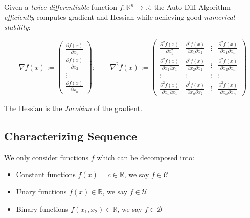 \documentclass[11pt,a4paper]{article}
\def\R{{\mathbb R}}
\theoremstyle{definition} %
\begin{document}
Given a \textit{twice differentiable} function $f: \R^n \to \R$, the
Auto-Diff Algorithm \textit{efficiently} computes gradient and Hessian
while achieving good \textit{numerical stability}:

\[
	\nabla f(x) := \begin{pmatrix}
		\frac{\partial f(x)}{\partial x_1} \\
		\frac{\partial f(x)}{\partial x_2} \\
		\vdots                             \\
		\frac{\partial f(x)}{\partial x_n}
	\end{pmatrix} ;
	\qquad
	\nabla ^2 f(x) :=
	\begin{pmatrix}
		\frac{\partial^2 f(x)}{\partial x_1^2}            &
		\frac{\partial^2 f(x)}{\partial x_1 \partial x_2} &
		\vdots                                            &
		\frac{\partial^2 f(x)}{\partial x_1 \partial x_n}   \\
		\frac{\partial^2 f(x)}{\partial x_2 \partial x_1} &
		\frac{\partial^2 f(x)}{\partial x_2 \partial x_2} &
		\vdots                                            &
		\frac{\partial^2 f(x)}{\partial x_2 \partial x_n}   \\
		\vdots                                            &
		\vdots                                            &
		\vdots                                            &
		\vdots                                              \\
		\frac{\partial^2 f(x)}{\partial x_n \partial x_1} &
		\frac{\partial^2 f(x)}{\partial x_n \partial x_2} &
		\vdots                                            &
		\frac{\partial^2 f(x)}{\partial x_n \partial x_n}
	\end{pmatrix}
\]

The Hessian is the \textit{Jacobian} of the gradient.

\subsection{Characterizing Sequence}

We only consider functions $f$ which can be decomposed into:

\begin{itemize}
	\item Constant functions $f(x) = c \in \R$, we say $f \in \mathcal{C}$
	\item Unary functions $f(x) \in \R$, we say $f \in \mathcal{U}$
	\item Binary functions $f(x_1, x_2) \in \R$, we say $f \in \mathcal{B}$
\end{itemize}
\end{document}
